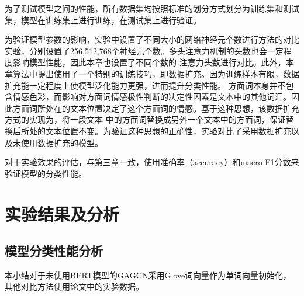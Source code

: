 为了测试模型之间的性能，所有数据集均按照标准的划分方式划分为训练集和测试集，模型在训练集上进行训练，在测试集上进行验证。

为验证模型参数的影响，实验中设置了不同大小的网络神经元个数进行方法的对比实验，分别设置了256,512,768个神经元个数。多头注意力机制的头数也会一定程度影响模型性能，因此本章也设置了不同个数的
注意力头数进行对比。此外，本章算法中提出使用了一个特别的训练技巧，即数据扩充。因为训练样本有限，数据扩充能一定程度上使模型泛化能力更强，进而提升分类性能。
方面词本身并不包含情感色彩，而影响对方面词情感极性判断的决定性因素是文本中的其他词汇。因此方面词所处在的文本位置决定了这个方面词的情感。基于这种思想，该数据扩充方式的实现为，将一段文本
中的方面词替换成另外一个文本中的方面词，保证替换后所处的文本位置不变。为验证这种思想的正确性，实验对比了采用数据扩充以及未使用数据扩充的模型。

对于实验效果的评估，与第三章一致，使用准确率（accuracy）和macro-F1分数来验证模型的分类性能。

\section{实验结果及分析}
\subsection{模型分类性能分析}
本小结对于未使用BERT模型的GAGCN采用Glove词向量作为单词向量初始化，其他对比方法使用论文中的实验数据。

